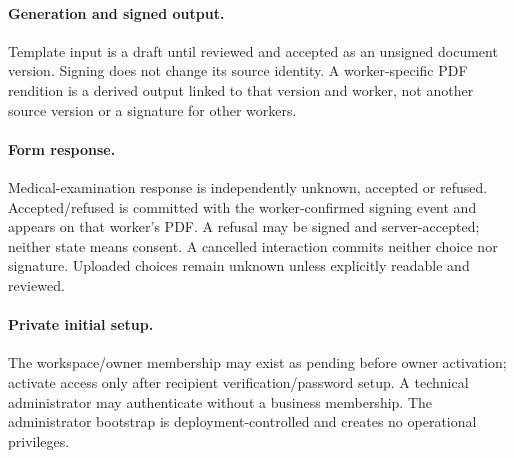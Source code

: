 \paragraph{Generation and signed output.}
Template input is a draft until reviewed and accepted as an unsigned document
version. Signing does not change its source identity. A worker-specific PDF
rendition is a derived output linked to that version and worker, not another
source version or a signature for other workers.

\paragraph{Form response.}
Medical-examination response is independently unknown, accepted or refused.
Accepted/refused is committed with the worker-confirmed signing event and appears
on that worker's PDF. A refusal may be signed and server-accepted; neither state
means consent. A cancelled interaction commits neither choice nor signature.
Uploaded choices remain unknown unless explicitly readable and reviewed.

\paragraph{Private initial setup.}
The workspace/owner membership may exist as pending before owner activation;
activate access only after recipient verification/password setup. A technical
administrator may authenticate without a business membership. The administrator
bootstrap is deployment-controlled and creates no operational privileges.

